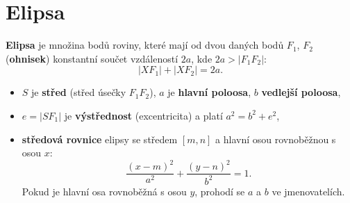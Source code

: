 \section{Elipsa}\label{sec:elipsa}

\begin{definitionbox}
  \textbf{Elipsa} je množina bodů roviny, které mají od dvou daných bodů $F_1$, $F_2$ (\textbf{ohnisek}) konstantní součet vzdáleností $2a$, kde $2a > |F_1F_2|$:
  \begin{equation*}
    |XF_1| + |XF_2| = 2a.
  \end{equation*}
  \begin{itemize}
    \item $S$ je \textbf{střed} (střed úsečky $F_1F_2$), $a$ je \textbf{hlavní poloosa}, $b$ \textbf{vedlejší poloosa},
    \item $e = |SF_1|$ je \textbf{výstřednost} (excentricita) a platí $a^2 = b^2 + e^2$,
    \item \textbf{středová rovnice} elipsy se středem $[m, n]$ a hlavní osou rovnoběžnou s osou $x$:
    \begin{equation*}
      \frac{{(x - m)}^2}{a^2} + \frac{{(y - n)}^2}{b^2} = 1.
    \end{equation*}
    Pokud je hlavní osa rovnoběžná s osou $y$, prohodí se $a$ a $b$ ve jmenovatelích.
  \end{itemize}
\end{definitionbox}

\begin{center}
\end{center}

